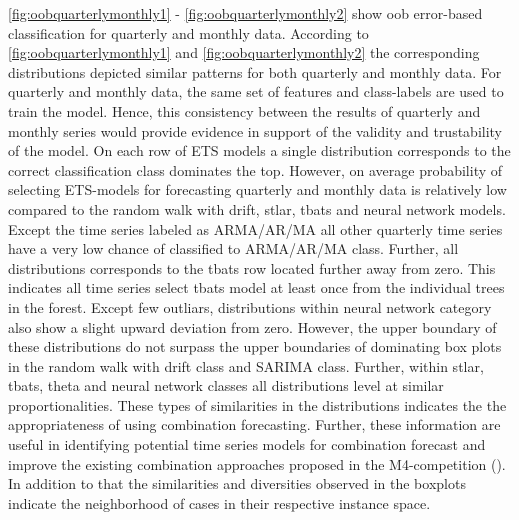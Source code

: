 \documentclass[11pt,a4paper,]{article}
\begin{document}
\autoref{fig:oobquarterlymonthly1} - \autoref{fig:oobquarterlymonthly2}
show oob error-based classification for quarterly and monthly data.
According to \autoref{fig:oobquarterlymonthly1} and
\autoref{fig:oobquarterlymonthly2} the corresponding distributions
depicted similar patterns for both quarterly and monthly data. For
quarterly and monthly data, the same set of features and class-labels
are used to train the model. Hence, this consistency between the results
of quarterly and monthly series would provide evidence in support of the
validity and trustability of the model. On each row of ETS models a
single distribution corresponds to the correct classification class
dominates the top. However, on average probability of selecting
ETS-models for forecasting quarterly and monthly data is relatively low
compared to the random walk with drift, stlar, tbats and neural network
models. Except the time series labeled as ARMA/AR/MA all other quarterly
time series have a very low chance of classified to ARMA/AR/MA class.
Further, all distributions corresponds to the tbats row located further
away from zero. This indicates all time series select tbats model at
least once from the individual trees in the forest. Except few outliars,
distributions within neural network category also show a slight upward
deviation from zero. However, the upper boundary of these distributions
do not surpass the upper boundaries of dominating box plots in the
random walk with drift class and SARIMA class. Further, within stlar,
tbats, theta and neural network classes all distributions level at
similar proportionalities. These types of similarities in the
distributions indicates the the appropriateness of using combination
forecasting. Further, these information are useful in identifying
potential time series models for combination forecast and improve the
existing combination approaches proposed in the M4-competition
(\textcite{Makridakis2018dx}). In addition to that the similarities and
diversities observed in the boxplots indicate the neighborhood of cases
in their respective instance space.
\end{document}
